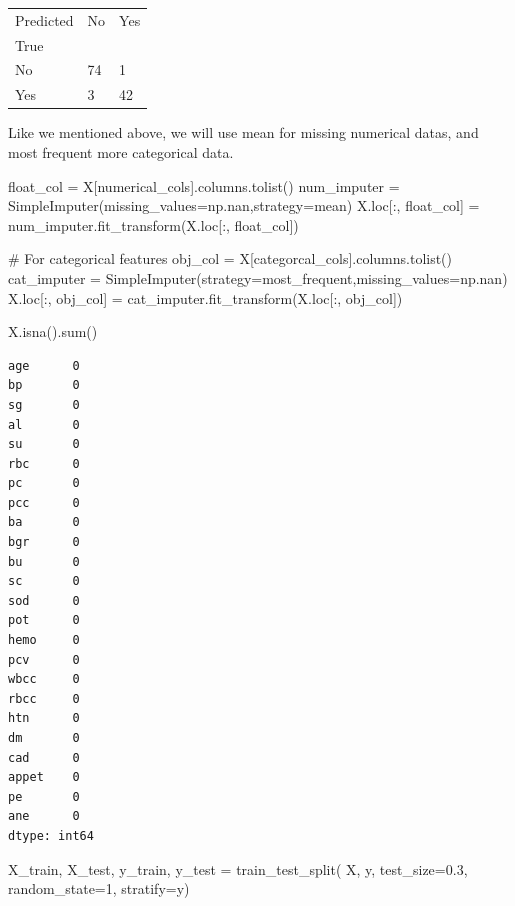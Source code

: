 \documentclass[
  11pt,
  letterpaper,
  DIV=11,
  numbers=noendperiod]{scrartcl}
\newenvironment{Shaded}{\begin{snugshade}}{\end{snugshade}}
\newcommand{\BuiltInTok}[1]{\textcolor[rgb]{0.00,0.23,0.31}{#1}}
\newcommand{\CommentTok}[1]{\textcolor[rgb]{0.37,0.37,0.37}{#1}}
\newcommand{\DecValTok}[1]{\textcolor[rgb]{0.68,0.00,0.00}{#1}}
\newcommand{\FloatTok}[1]{\textcolor[rgb]{0.68,0.00,0.00}{#1}}
\newcommand{\NormalTok}[1]{\textcolor[rgb]{0.00,0.23,0.31}{#1}}
\newcommand{\OperatorTok}[1]{\textcolor[rgb]{0.37,0.37,0.37}{#1}}
\newcommand{\StringTok}[1]{\textcolor[rgb]{0.13,0.47,0.30}{#1}}
\begin{document}
\begin{longtable}[]{@{}lll@{}}
\toprule\noalign{}
Predicted & No & Yes \\
True & & \\
\midrule\noalign{}
\endhead
\bottomrule\noalign{}
\endlastfoot
No & 74 & 1 \\
Yes & 3 & 42 \\
\end{longtable}

Like we mentioned above, we will use mean for missing numerical datas,
and most frequent more categorical data.

\begin{Shaded}
\begin{Highlighting}[]
\NormalTok{float\_col }\OperatorTok{=}\NormalTok{ X[numerical\_cols].columns.tolist()}
\NormalTok{num\_imputer }\OperatorTok{=}\NormalTok{ SimpleImputer(missing\_values}\OperatorTok{=}\NormalTok{np.nan,strategy}\OperatorTok{=}\StringTok{\textquotesingle{}mean\textquotesingle{}}\NormalTok{)}
\NormalTok{X.loc[:, float\_col] }\OperatorTok{=}\NormalTok{ num\_imputer.fit\_transform(X.loc[:, float\_col])}

\CommentTok{\# For categorical features}
\NormalTok{obj\_col }\OperatorTok{=}\NormalTok{ X[categorcal\_cols].columns.tolist()}
\NormalTok{cat\_imputer }\OperatorTok{=}\NormalTok{ SimpleImputer(strategy}\OperatorTok{=}\StringTok{\textquotesingle{}most\_frequent\textquotesingle{}}\NormalTok{,missing\_values}\OperatorTok{=}\NormalTok{np.nan)}
\NormalTok{X.loc[:, obj\_col] }\OperatorTok{=}\NormalTok{ cat\_imputer.fit\_transform(X.loc[:, obj\_col])}
\end{Highlighting}
\end{Shaded}

\begin{Shaded}
\begin{Highlighting}[]
\NormalTok{X.isna().}\BuiltInTok{sum}\NormalTok{()}
\end{Highlighting}
\end{Shaded}

\begin{verbatim}
age      0
bp       0
sg       0
al       0
su       0
rbc      0
pc       0
pcc      0
ba       0
bgr      0
bu       0
sc       0
sod      0
pot      0
hemo     0
pcv      0
wbcc     0
rbcc     0
htn      0
dm       0
cad      0
appet    0
pe       0
ane      0
dtype: int64
\end{verbatim}

\begin{Shaded}
\begin{Highlighting}[]
\NormalTok{X\_train, X\_test, y\_train, y\_test }\OperatorTok{=}\NormalTok{ train\_test\_split(}
\NormalTok{    X, y, test\_size}\OperatorTok{=}\FloatTok{0.3}\NormalTok{, random\_state}\OperatorTok{=}\DecValTok{1}\NormalTok{, stratify}\OperatorTok{=}\NormalTok{y)}
\end{Highlighting}
\end{Shaded}
\end{document}
